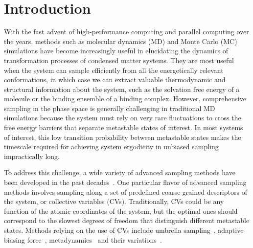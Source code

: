\documentclass[journal=jacsat,manuscript=article]{achemso}
\begin{document}
\section{Introduction}
With the fast advent of high-performance computing and parallel computing over the years, methods such as molecular dynamics (MD) and Monte Carlo (MC) simulations have become increasingly useful in elucidating the dynamics of transformation processes of condensed matter systems. They are most useful when the system can sample efficiently from all the energetically relevant conformations, in which case we can extract valuable thermodynamic and structural information about the system, such as the solvation free energy of a molecule or the binding ensemble of a binding complex. However, comprehensive sampling in the phase space is generally challenging in traditional MD simulations because the system must rely on very rare fluctuations to cross the free energy barriers that separate metastable states of interest. In most systems of interest, this low transition probability between metastable states makes the timescale required for achieving system ergodicity in unbiased sampling impractically long. 

To address this challenge, a wide variety of advanced sampling methods have been developed in the past decades~\cite{henin2022enhanced}. One particular flavor of advanced sampling methods involves sampling along a set of predefined coarse-grained descriptors of the system, or collective variables (CVs). Traditionally, CVs could be any function of the atomic coordinates of the system, but the optimal ones should correspond to the slowest degrees of freedom that distinguish different metastable states. Methods relying on the use of CVs include umbrella sampling~\cite{umbrella}, adaptive biasing force~\cite{ABF}, metadynamics~\cite{metad} and their variations~\cite{bussi2006free, bonomi2010enhanced, var2}. 
\end{document}
